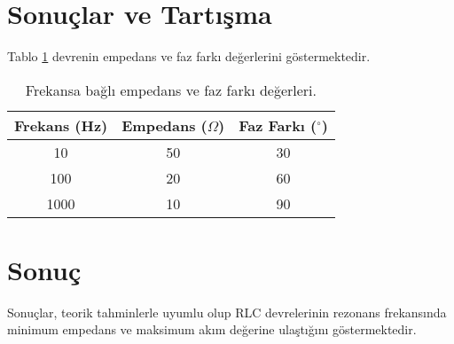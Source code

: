 \documentclass[11pt,letterpaper,twocolumn]{fenbil}
\begin{document}
\section{Sonuçlar ve Tartışma}
\justify
Tablo \ref{tab:sonuclar} devrenin empedans ve faz farkı değerlerini göstermektedir.

\begin{table}[H]
    \centering
    \begin{tabular}{|c|c|c|}
    \hline
    Frekans (Hz) & Empedans (\(\Omega\)) & Faz Farkı (\(^\circ\)) \\ \hline
    10 & 50 & 30 \\ \hline
    100 & 20 & 60 \\ \hline
    1000 & 10 & 90 \\ \hline
    \end{tabular}
    \caption{Frekansa bağlı empedans ve faz farkı değerleri.}
    \label{tab:sonuclar}
\end{table}

\section{Sonuç}
\justify
Sonuçlar, teorik tahminlerle uyumlu olup RLC devrelerinin rezonans frekansında minimum empedans ve maksimum akım değerine ulaştığını göstermektedir.
\end{document}
